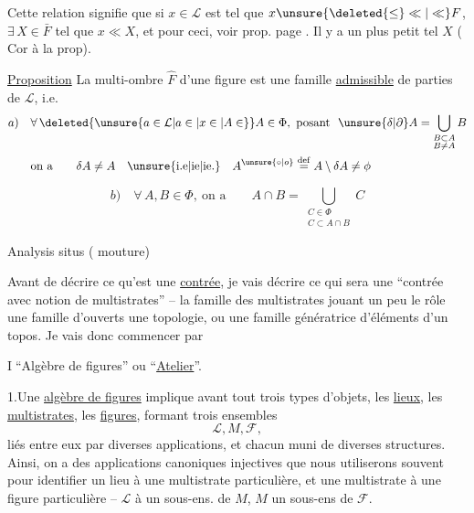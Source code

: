 Cette relation signifie que si $x\in\mathcal L$ est tel que $x\unsure{\deleted{\leq}\ll|\ll}F$, $\exists\,X\in\bar F$ tel que $x\ll X$, \unsure{\S|(*)|\&}
et pour ceci, voir prop. page . Il y a  un plus petit tel $X$ (\unsure{=|:} Cor à la prop).

\uline{Proposition} La multi-ombre \inserted{$\Phi=$} $\widehat F$ d'une figure est une famille \uline{admissible} de parties de $\mathcal L$, i.e.
\[
\begin{aligned}
a)\quad &\forall\,\deleted{\unsure{a\in\mathcal L|a\in|x\in|A\in}}A\in\Phi,\ \text{posant }\ \unsure{\delta|\partial}A=\bigcup_{\substack{B\subset A\\B\neq A}}B\\
&\text{on a}\qquad \delta A\neq A\quad\text{\unsure{i.e|ie|ie.}}\quad A^{\unsure{\circ|o}}\overset{\mathrm{def}}{=}A\setminus\delta A\neq\phi
\end{aligned}
\]

\[
b)\quad \forall\,A,B\in\Phi,\ \text{on a}\qquad A\cap B=\bigcup_{\substack{C\in\Phi\\C\subset A\cap B}}C
\]

\begin{center}Analysis situs ( mouture)\end{center}

Avant de décrire ce qu'est une \uline{contrée}, je vais décrire ce qui sera une ``contrée avec notion de multistrates'' -- la famille des multistrates  jouant un peu le rôle  une famille d'ouverts   une topologie, ou une famille génératrice d'éléments d'un topos. Je vais donc commencer par

\textcircled{I}\quad ``Algèbre de figures'' ou ``\uline{Atelier}''.

1.\quad Une \uline{algèbre de figures} implique avant tout trois types d'objets, les \uline{lieux}, les \uline{multistrates}, les \uline{figures}, formant trois ensembles
\begingroup
\makeatletter
\tagsleft@true
\let\veqno\@@leqno
\makeatother
\[
\mathcal{L},M,\mathcal{F},\tag*{(1.1.)}
\]
\endgroup
liés entre eux par diverses applications, et chacun muni de diverses structures. Ainsi, on a des applications canoniques injectives
que nous utiliserons souvent pour identifier un lieu à une multistrate particulière, et une multistrate à une figure particulière -- $\mathcal{L}$ à un sous-ens. de $M$, $M$  un sous-ens de $\mathcal{F}$.

